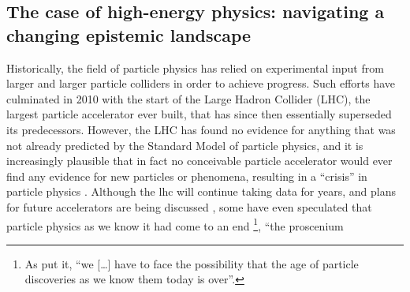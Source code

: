 \documentclass{article}
\begin{document}



\subsection{\label{sec:hep}The case of high-energy physics: navigating a changing epistemic landscape}

Historically, the field of particle physics has relied on experimental input from larger and larger particle colliders in order to achieve progress. Such efforts have culminated in 2010 with the start of the Large Hadron Collider (LHC), the largest particle accelerator ever built, that has since then essentially superseded its predecessors. However, the LHC has found no evidence for anything that was not already predicted by the Standard Model of particle physics, and it is increasingly plausible that in fact no conceivable particle accelerator would ever find any evidence for new particles or phenomena, resulting in a ``crisis'' in particle physics \citep{susy_crisis}. Although the \gls{lhc} will continue taking data for years, and plans for future accelerators are being discussed \citep{Roser2023}, some have even speculated that particle physics as we know it had come to an end \citep{Harlander2023,Kosyakov2023}\footnote{As \citet{Harlander2023} put it, ``we [\dots] have to face the possibility that the age of particle discoveries as we know them today is over''.}, ``the proscenium
\end{document}
